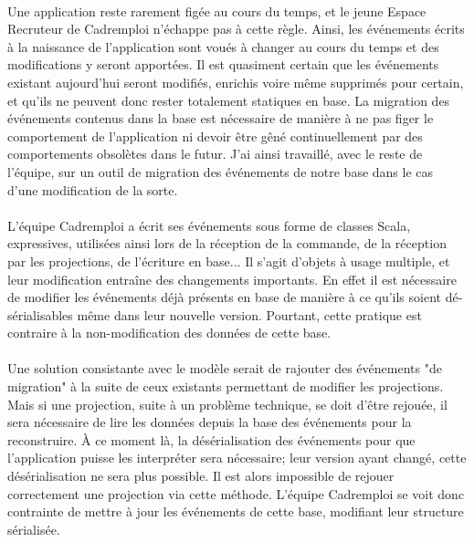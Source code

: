 \paragraph{}
Une application reste rarement figée au cours du temps, et le jeune Espace Recruteur de Cadremploi n'échappe pas à cette règle.
Ainsi, les événements écrits à la naissance de l'application sont voués à changer au cours du temps et des modifications y seront apportées.
Il est quasiment certain que les événements existant aujourd'hui seront modifiés, enrichis voire même supprimés pour certain, et qu'ils ne peuvent donc rester totalement statiques en base.
La migration des événements contenus dans la base est nécessaire de manière à ne pas figer le comportement de l'application ni devoir être gêné continuellement par des comportements obsolètes dans le futur.
J'ai ainsi travaillé, avec le reste de l'équipe, sur un outil de migration des événements de notre base dans le cas d'une modification de la sorte.

\paragraph{}
L'équipe Cadremploi a écrit ses événements sous forme de classes Scala, expressives, utilisées ainsi lors de la réception de la commande, de la réception par les projections, de l'écriture en base...
Il s'agit d'objets à usage multiple, et leur modification entraîne des changements importants.
En effet il est nécessaire de modifier les événements déjà présents en base de manière à ce qu'ils soient dé-sérialisables même dans leur nouvelle version.
Pourtant, cette pratique est contraire à la non-modification des données de cette base.
\paragraph{}
Une solution consistante avec le modèle serait de rajouter des événements "de migration" à la suite de ceux existants permettant de modifier les projections.
Mais si une projection, suite à un problème technique, se doit d'être rejouée, il sera nécessaire de lire les données depuis la base des événements pour la reconstruire.
À ce moment là, la désérialisation des événements pour que l'application puisse les interpréter sera nécessaire; leur version ayant changé, cette désérialisation ne sera plus possible.
Il est alors impossible de rejouer correctement une projection via cette méthode.
L'équipe Cadremploi se voit donc contrainte de mettre à jour les événements de cette base, modifiant leur structure sérialisée.
